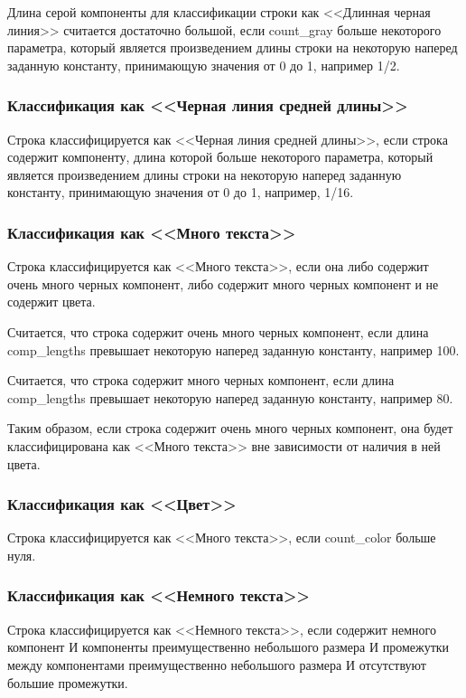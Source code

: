 Длина серой компоненты для классификации строки как <<Длинная черная линия>> считается достаточно большой, если count\_gray больше некоторого параметра, который является произведением длины строки на некоторую наперед заданную константу, принимающую значения от 0 до 1, например 1/2.

\subsubsection*{Классификация как <<Черная линия средней длины>>}

Строка классифицируется как <<Черная линия средней длины>>, если строка содержит компоненту, длина которой больше некоторого параметра, который является произведением длины строки на некоторую наперед заданную константу, принимающую значения от 0 до 1, например, 1/16.

\subsubsection*{Классификация как <<Много текста>>}

Строка классифицируется как <<Много текста>>, если она либо содержит очень много черных компонент, либо содержит много черных компонент и не содержит цвета.

Считается, что строка содержит очень много черных компонент, если длина comp\_lengths превышает некоторую наперед заданную константу, например 100.

Считается, что строка содержит много черных компонент, если длина comp\_lengths превышает некоторую наперед заданную константу, например 80.

Таким образом, если строка содержит очень много черных компонент, она будет классифицирована как <<Много текста>> вне зависимости от наличия в ней цвета.

\subsubsection*{Классификация как <<Цвет>>}

Строка классифицируется как <<Много текста>>, если count\_color больше нуля.

\subsubsection*{Классификация как <<Немного текста>>}

Строка классифицируется как <<Немного текста>>, если содержит немного компонент И компоненты преимущественно небольшого размера И промежутки между компонентами преимущественно небольшого размера И отсутствуют большие промежутки.

